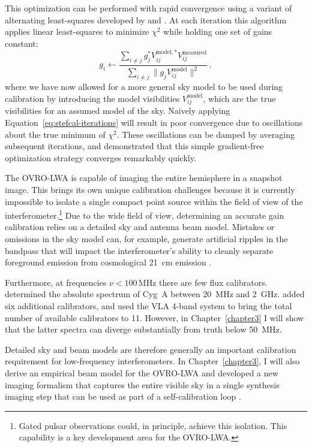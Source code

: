\begin{bibunit}
This optimization can be performed with rapid convergence using a variant of alternating
least-squares developed by \citet{2008ISTSP...2..707M} and \citet{2014A&A...571A..97S}. At each
iteration this algorithm applies linear least-squares to minimize $\chi^2$ while holding one set of
gains constant:
\begin{equation}\label{eq:stefcal-iterations}
    g_i \leftarrow \frac
        {\sum_{i \neq j} g_j^* V_{ij}^{\text{model},*} V_{ij}^\text{measured}}
        {\sum_{i \neq j} \| g_j V_{ij}^\text{model} \|^2}\,,
\end{equation}
where we have now allowed for a more general sky model to be used during calibration by introducing
the model visibilities $V_{ij}^\text{model}$, which are the true visibilities for an assumed model
of the sky.  Naively applying Equation~\ref{eq:stefcal-iterations} will result in poor convergence
due to oscillations about the true minimum of $\chi^2$.  These oscillations can be damped by
averaging subsequent iterations, and \citet{2014A&A...571A..97S} demonstrated that this simple
gradient-free optimization strategy converges remarkably quickly.

The OVRO-LWA is capable of imaging the entire hemisphere in a snapshot image. This brings its own
unique calibration challenges because it is currently impossible to isolate a single compact point source
within the field of view of the interferometer.\footnote{
    Gated pulsar observations could, in principle, achieve this isolation. This capability is a key
    development area for the OVRO-LWA.
}
Due to the wide field of view, determining an accurate gain calibration relies on a detailed sky and
antenna beam model. Mistakes or omissions in the sky model can, for example, generate artificial
ripples in the bandpass that will impact the interferometer's ability to cleanly separate foreground
emission from cosmological 21~cm emission \citep{2016MNRAS.461.3135B, 2017MNRAS.470.1849E}.

Furthermore, at frequencies $\nu < 100\,\text{MHz}$ there are few flux calibrators.
\citet{1977A&A....61...99B} determined the absolute spectrum of Cyg~A between 20~MHz and 2~GHz.
\citet{2012MNRAS.423L..30S} added six additional calibrators, and \citet{2017ApJS..230....7P} used
the VLA 4-band system to bring the total number of available calibrators to 11. However, in
Chapter~\ref{chapter3} I will show that the latter spectra can diverge substantially from truth
below 50~MHz.

Detailed sky and beam models are therefore generally an important calibration requirement for
low-frequency interferometers.  In Chapter~\ref{chapter3}, I will also derive an empirical beam
model for the OVRO-LWA and developed a new imaging formalism that captures the entire visible sky in
a single synthesis imaging step that can be used as part of a self-calibration loop
\citep{1978ApJ...223...25R}.


\end{bibunit}
